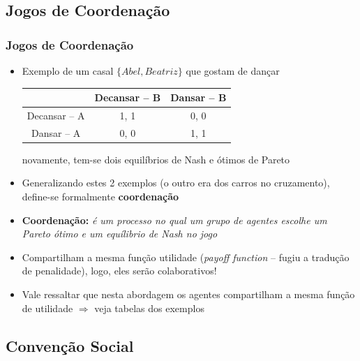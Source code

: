 

\subsection{Jogos de Coordenação}

\begin{frame}
\frametitle{Jogos de Coordenação}

\begin{itemize}
  \item Exemplo de um casal $\{Abel, Beatriz\}$ que gostam de dançar
    \begin{center}
      \begin{tabular}{c || c | c}
                 & Decansar -- B & Dansar -- B \\ \hline  \hline
      Decansar -- A   & 1, 1     &  0, 0      \\ \hline
      Dansar -- A     & 0, 0     &  1, 1         \\ \hline
      \end{tabular}
    \end{center}

novamente, tem-se dois equilíbrios de Nash e ótimos de Pareto

\item Generalizando estes 2 exemplos (o outro era dos carros no cruzamento), 
define-se formalmente  \textbf{coordenação}
 
 \item \textbf{Coordenação:} \textit{é um processo no qual  um grupo de agentes escolhe um Pareto ótimo e um equílibrio de Nash no jogo}
 
 \item Compartilham a mesma função utilidade
  (\textit{payoff function} -- fugiu a tradução de penalidade), logo, eles  serão
  colaborativos!
 
  \item Vale ressaltar que nesta abordagem os agentes compartilham a mesma função de utilidade $\Rightarrow $ veja tabelas dos exemplos
  
 
\end{itemize}
\end{frame}







\subsection{Convenção Social}

